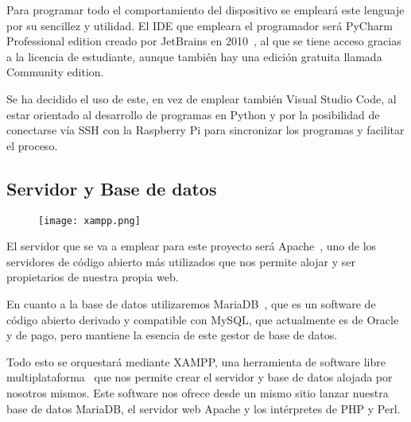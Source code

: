 Para programar todo el comportamiento del dispositivo se empleará este lenguaje por su sencillez y utilidad. El IDE que empleara el programador será PyCharm Professional edition creado por JetBrains en 2010~\cite{noauthor_pycharm_2021}, al que se tiene acceso gracias a la licencia de estudiante, aunque también hay una edición gratuita llamada Community edition.

Se ha decidido el uso de este, en vez de emplear también Visual Studio Code, al estar orientado al desarrollo de programas en Python y por la posibilidad de conectarse vía SSH con la Raspberry Pi para sincronizar los programas y facilitar el proceso.

\subsection{Servidor y Base de datos}\label{subsec:servidorDB}
\begin{figure}[H]
	{\texttt{[image: xampp.png]}}\label{fig:logoXAMPP}
\end{figure}
El servidor que se va a emplear para este proyecto será Apache~\cite{noauthor_apache_nodate}, uno de los servidores de código abierto más utilizados que nos permite alojar y ser propietarios de nuestra propia web.

En cuanto a la base de datos utilizaremos MariaDB~\cite{noauthor_mariadb_nodate}, que es un software de código abierto derivado y compatible con MySQL, que actualmente es de Oracle y de pago, pero mantiene la esencia de este gestor de base de datos.

Todo esto se orquestará mediante XAMPP, una herramienta de software libre multiplataforma~\cite{noauthor_xampp_nodate} que nos permite crear el servidor y base de datos alojada por nosotros mismos. Este software nos ofrece desde un mismo sitio lanzar nuestra base de datos MariaDB, el servidor web Apache y los intérpretes de PHP y Perl.